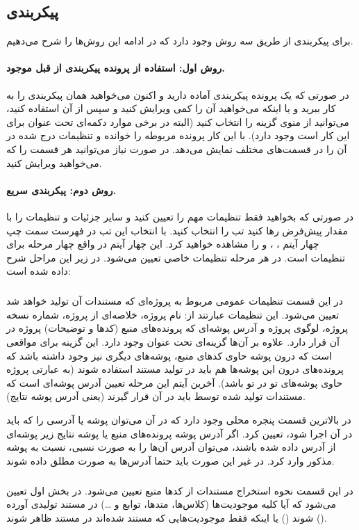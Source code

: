 \subsection{پیکربندی}
برای پیکربندی  از طریق  سه روش وجود دارد که در ادامه این روش‌ها را شرح می‌دهیم.
\paragraph{روش اول: استفاده از پرونده پیکربندی از قبل موجود.}
در صورتی که یک پرونده پیکربندی آماده دارید و اکنون می‌خواهید همان پیکربندی را به کار ببرید و یا اینکه می‌خواهید 
آن را کمی ویرایش کنید و سپس از آن استفاده کنید، می‌توانید از منوی  گزینه  را انتخاب کنید (البته در 
برخی موارد دکمه‌ای تحت عنوان  برای این کار است وجود دارد). با این کار  پرونده مربوطه را 
خوانده و تنظیمات درج شده در آن را در قسمت‌های مختلف نمایش می‌دهد. در صورت نیاز می‌توانید هر قسمت را که می‌خواهید ویرایش 
کنید.
\paragraph{روش دوم: پیکربندی سریع.}
در صورتی که بخواهید فقط تنظیمات مهم را تعیین کنید و سایر جزئیات و تنظیمات را با مقدار پیش‌فرض رها کنید 
تب  را انتخاب کنید. با انتخاب این تب در فهرست سمت چپ چهار 
آیتم ، ،  و  را مشاهده خواهید کرد. این چهار آیتم در واقع 
چهار مرحله برای تنظیمات است. در هر مرحله تنظیمات خاصی تعیین می‌شود. در زیر این مراحل شرح داده شده است:
\subparagraph{}
در این قسمت تنظیمات عمومی مربوط به پروژه‌ای که مستندات آن تولید خواهد شد تعیین می‌شود. این تنظیمات عبارتند از: 
نام پروژه، خلاصه‌ای از پروژه، شماره نسخه پروژه، لوگوی پروژه و آدرس پوشه‌ای که پرونده‌های منبع (کدها و توضیحات) پروژه 
در آن قرار دارد. علاوه بر آن‌ها گزینه‌ای تحت عنوان  وجود دارد. این گزینه برای مواقعی است که 
درون پوشه حاوی کدهای منبع، پوشه‌های دیگری نیز وجود داشته باشد که پرونده‌های درون این پوشه‌ها هم باید در تولید مستند 
استفاده شوند (به عبارتی پروژه حاوی پوشه‌های تو در تو باشد). آخرین آیتم این مرحله تعیین آدرس پوشه‌ای است که مستندات 
تولید شده توسط  باید در آن قرار گیرند (یعنی آدرس پوشه نتایج).

در بالاترین قسمت پنجره  محلی وجود دارد که در آن می‌توان پوشه‌ یا آدرسی را که  باید در آن 
اجرا شود، تعیین کرد. اگر آدرس پوشه پرونده‌های منبع یا پوشه نتایج زیر پوشه‌ای از آدرس داده شده باشند، می‌توان آدرس آن‌ها 
را به صورت نسبی، نسبت به پوشه مذکور وارد کرد. در غیر این صورت باید حتما آدرس‌ها به صورت مطلق داده شوند.
\subparagraph{}
در این قسمت نحوه استخراج مستندات از کدها منبع تعیین می‌شود. در بخش اول تعیین می‌شود که آیا کلیه موجودیت‌ها (کلاس‌ها، 
متدها، توابع و \ldots) در مستند تولیدی آورده شوند () یا اینکه فقط موجودیت‌هایی که مستند شده‌اند 
در مستند ظاهر شوند ().


